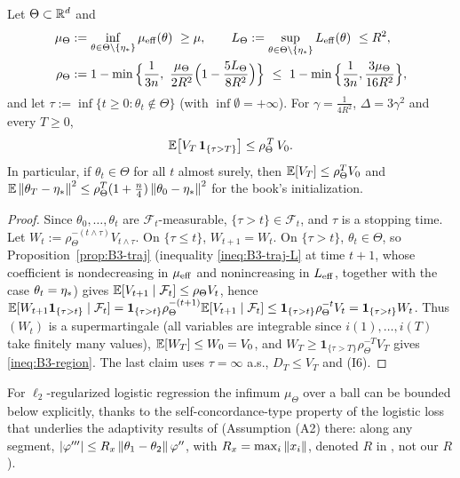 \begin{proposition}\label{prop:B3-region}
Let $\Theta\subset\mathbb{R}^d$ and
\begin{align*}
\mu_\Theta&:=\inf_{\theta\in\Theta\setminus\{\etastar\}}\muEff(\theta)\ \ge\mu,\qquad
L_\Theta:=\sup_{\theta\in\Theta\setminus\{\etastar\}}\LEff(\theta)\ \le R^2,\\
\rho_\Theta&:=1-\min\Big\{\frac1{3n},\ \frac{\mu_\Theta}{2R^2}\Big(1-\frac{5L_\Theta}{8R^2}\Big)\Big\}\ \le\ 1-\min\Big\{\frac1{3n},\frac{3\mu_\Theta}{16R^2}\Big\},
\end{align*}
and let $\tau:=\inf\{t\ge0:\theta_t\notin\Theta\}$ (with $\inf\emptyset=+\infty$). For $\gamma=\frac1{4R^2}$, $\Delta=3\gamma^2$ and every $T\ge0$,
\begin{equation}\label{ineq:B3-region}
\mathbb{E}\big[V_T\,\mathbf 1_{\{\tau>T\}}\big]\le\rho_\Theta^{\,T}\,V_0 .
\end{equation}
In particular, if $\theta_t\in\Theta$ for all $t$ almost surely, then $\mathbb{E}[V_T]\le\rho_\Theta^TV_0$ and $\mathbb{E}\left\|\theta_T-\eta_\ast\right\|^2\le\rho_\Theta^T(1+\frac n4)\left\|\theta_0-\eta_\ast\right\|^2$ for the book's initialization.
\end{proposition}
\begin{proof}
Since $\theta_0,\dots,\theta_t$ are $\mathcal F_t$-measurable, $\{\tau>t\}\in\mathcal F_t$, and $\tau$ is a stopping time. Let $W_t:=\rho_\Theta^{-(t\wedge\tau)}V_{t\wedge\tau}$. On $\{\tau\le t\}$, $W_{t+1}=W_t$. On $\{\tau>t\}$, $\theta_t\in\Theta$, so Proposition~\ref{prop:B3-traj} (inequality \eqref{ineq:B3-traj-L} at time $t+1$, whose coefficient is nondecreasing in $\mu_{\mathrm{eff}}$ and nonincreasing in $L_{\mathrm{eff}}$, together with the case $\theta_t=\eta_\ast$) gives $\mathbb{E}[V_{t+1}\mid\mathcal F_t]\le\rho_\Theta V_t$, hence
$\mathbb{E}[W_{t+1}\mathbf 1_{\{\tau>t\}}\mid\mathcal F_t]=\mathbf 1_{\{\tau>t\}}\rho_\Theta^{-(t+1)}\mathbb{E}[V_{t+1}\mid\mathcal F_t]\le\mathbf 1_{\{\tau>t\}}\rho_\Theta^{-t}V_t=\mathbf 1_{\{\tau>t\}}W_t$.
Thus $(W_t)$ is a supermartingale (all variables are integrable since $i(1),\dots,i(T)$ take finitely many values), $\mathbb{E}[W_T]\le W_0=V_0$, and $W_T\ge\mathbf 1_{\{\tau>T\}}\rho_\Theta^{-T}V_T$ gives \eqref{ineq:B3-region}. The last claim uses $\tau=\infty$ a.s., $D_T\le V_T$ and (I6).
\end{proof}

For $\ell_2$-regularized logistic regression the infimum $\mu_\Theta$ over a ball can be bounded below explicitly, thanks to the self-concordance-type property of the logistic loss that underlies the adaptivity results of \cite{bach2014adaptivity} (Assumption (A2) there: along any segment, $\left|\varphi'''\right|\le R_x\left\|\theta_1-\theta_2\right\|\varphi''$, with $R_x=\max_i\left\|x_i\right\|$, denoted $R$ in \cite{bach2014adaptivity}, not our $R$).

